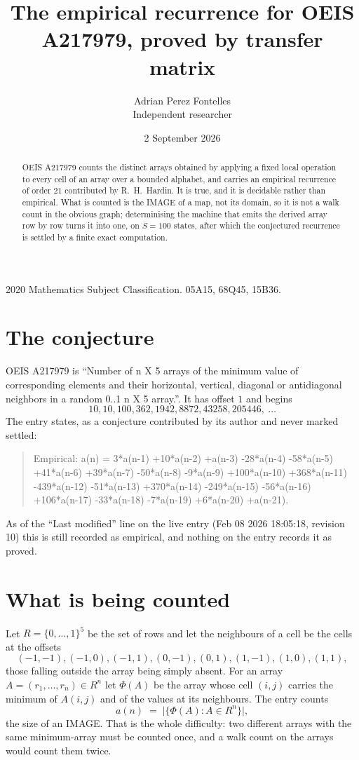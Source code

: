 \documentclass[11pt,a4paper]{article}
\title{The empirical recurrence for OEIS A217979, proved by transfer matrix}
\author{Adrian Perez Fontelles\\ \small Independent researcher}
\date{2 September 2026}
\theoremstyle{plain}
\theoremstyle{definition}
\begin{document}
\maketitle

\begin{abstract}
OEIS A217979 counts the distinct arrays obtained by applying a fixed local operation to every cell
of an array over a bounded alphabet, and carries an empirical recurrence of order $21$
contributed by R.~H.~Hardin. It is true, and it is decidable rather than empirical. What is
counted is the IMAGE of a map, not its domain, so it is not a walk count in the obvious graph;
determinising the machine that emits the derived array row by row turns it into one, on
$S=100$ states, after which the conjectured recurrence is settled by a finite exact
computation.
\end{abstract}

\noindent\small 2020 Mathematics Subject Classification. 05A15, 68Q45, 15B36.\normalsize

\section{The conjecture}

OEIS A217979 is ``Number of n X 5 arrays of the minimum value of corresponding elements and their horizontal, vertical, diagonal or antidiagonal neighbors in a random 0..1 n X 5 array.''. It has offset $1$ and begins
\[
10, 10, 100, 362, 1942, 8872, 43258, 205446,\ \dots
\]
The entry states, as a conjecture contributed by its author and never marked settled:
\begin{quote}
Empirical: a(n) = 3*a(n-1) +10*a(n-2) +a(n-3) -28*a(n-4) -58*a(n-5) +41*a(n-6) +39*a(n-7) -50*a(n-8) -9*a(n-9) +100*a(n-10) +368*a(n-11) -439*a(n-12) -51*a(n-13) +370*a(n-14) -249*a(n-15) -56*a(n-16) +106*a(n-17) -33*a(n-18) -7*a(n-19) +6*a(n-20) +a(n-21).
\end{quote}
As of the ``Last modified'' line on the live entry (Feb 08 2026 18:05:18, revision 10) this is still
recorded as empirical, and nothing on the entry records it as proved.

\section{What is being counted}

Let $R=\{0,\dots,1\}^{5}$ be the set of rows and let the neighbours of
a cell be the cells at the offsets
\[
(-1,-1), (-1,0), (-1,1), (0,-1), (0,1), (1,-1), (1,0), (1,1),
\]
those falling outside the array being simply absent. For an array
$A=(r_1,\dots,r_n)\in R^n$ let $\Phi(A)$ be the array whose cell $(i,j)$ carries the
minimum of $A(i,j)$ and of the values at its neighbours. The entry counts
\[
a(n)\;=\;\bigl|\{\Phi(A):A\in R^n\}\bigr| ,
\]
the size of an IMAGE. That is the whole difficulty: two different arrays with the same
minimum-array must be counted once, and a walk count on the arrays would count them twice.
\end{document}
